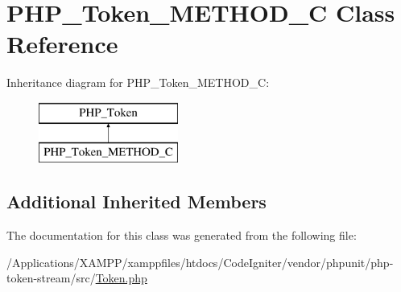 \hypertarget{class_p_h_p___token___m_e_t_h_o_d___c}{}\section{P\+H\+P\+\_\+\+Token\+\_\+\+M\+E\+T\+H\+O\+D\+\_\+C Class Reference}
\label{class_p_h_p___token___m_e_t_h_o_d___c}
Inheritance diagram for P\+H\+P\+\_\+\+Token\+\_\+\+M\+E\+T\+H\+O\+D\+\_\+C\+:\begin{figure}[H]
\begin{center}
\leavevmode
\includegraphics[height=2.000000cm]{class_p_h_p___token___m_e_t_h_o_d___c}
\end{center}
\end{figure}
\subsection*{Additional Inherited Members}


The documentation for this class was generated from the following file\+:\begin{DoxyCompactItemize}
\item 
/\+Applications/\+X\+A\+M\+P\+P/xamppfiles/htdocs/\+Code\+Igniter/vendor/phpunit/php-\/token-\/stream/src/\mbox{\hyperlink{_token_8php}{Token.\+php}}\end{DoxyCompactItemize}
